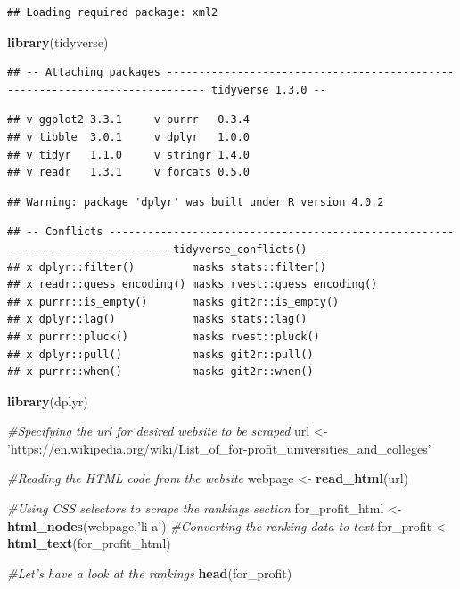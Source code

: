 \documentclass[
]{article}
\newenvironment{Shaded}{\begin{snugshade}}{\end{snugshade}}
\newcommand{\CommentTok}[1]{\textcolor[rgb]{0.56,0.35,0.01}{\textit{#1}}}
\newcommand{\KeywordTok}[1]{\textcolor[rgb]{0.13,0.29,0.53}{\textbf{#1}}}
\newcommand{\NormalTok}[1]{#1}
\newcommand{\StringTok}[1]{\textcolor[rgb]{0.31,0.60,0.02}{#1}}
\begin{document}
\begin{verbatim}
## Loading required package: xml2
\end{verbatim}

\begin{Shaded}
\begin{Highlighting}[]
\KeywordTok{library}\NormalTok{(tidyverse)}
\end{Highlighting}
\end{Shaded}

\begin{verbatim}
## -- Attaching packages ---------------------------------------------------------------------------- tidyverse 1.3.0 --
\end{verbatim}

\begin{verbatim}
## v ggplot2 3.3.1     v purrr   0.3.4
## v tibble  3.0.1     v dplyr   1.0.0
## v tidyr   1.1.0     v stringr 1.4.0
## v readr   1.3.1     v forcats 0.5.0
\end{verbatim}

\begin{verbatim}
## Warning: package 'dplyr' was built under R version 4.0.2
\end{verbatim}

\begin{verbatim}
## -- Conflicts ------------------------------------------------------------------------------- tidyverse_conflicts() --
## x dplyr::filter()         masks stats::filter()
## x readr::guess_encoding() masks rvest::guess_encoding()
## x purrr::is_empty()       masks git2r::is_empty()
## x dplyr::lag()            masks stats::lag()
## x purrr::pluck()          masks rvest::pluck()
## x dplyr::pull()           masks git2r::pull()
## x purrr::when()           masks git2r::when()
\end{verbatim}

\begin{Shaded}
\begin{Highlighting}[]
\KeywordTok{library}\NormalTok{(dplyr)}
\end{Highlighting}
\end{Shaded}

\begin{Shaded}
\begin{Highlighting}[]
\CommentTok{#Specifying the url for desired website to be scraped}
\NormalTok{url <-}\StringTok{ 'https://en.wikipedia.org/wiki/List_of_for-profit_universities_and_colleges'}

\CommentTok{#Reading the HTML code from the website}
\NormalTok{webpage <-}\StringTok{ }\KeywordTok{read_html}\NormalTok{(url)}

\CommentTok{#Using CSS selectors to scrape the rankings section}
\NormalTok{for_profit_html <-}\StringTok{ }\KeywordTok{html_nodes}\NormalTok{(webpage,}\StringTok{'li a'}\NormalTok{)}
\CommentTok{#Converting the ranking data to text}
\NormalTok{for_profit <-}\StringTok{ }\KeywordTok{html_text}\NormalTok{(for_profit_html)}

\CommentTok{#Let's have a look at the rankings}
\KeywordTok{head}\NormalTok{(for_profit)}
\end{Highlighting}
\end{Shaded}
\end{document}
